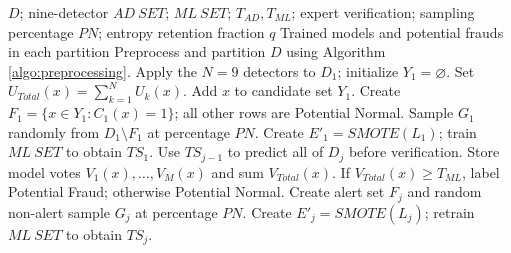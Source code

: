 \begin{algorithm}[htbp]
\footnotesize
\caption{Multilayered structure of the SAD algorithm}\label{algo:multilayer}
\begin{algorithmic}[1]
\REQUIRE $D$; nine-detector $AD\ SET$; $ML\ SET$; $T_{AD},T_{ML}$;
\STATE \hspace{1em} expert verification; sampling percentage $PN$; entropy retention fraction $q$
\ENSURE Trained models and potential frauds in each partition
\STATE Preprocess and partition $D$ using Algorithm \ref{algo:preprocessing}.
\STATE Apply the $N=9$ detectors to $D_1$; initialize $Y_1=\varnothing$.
\STATE Set $U_{Total}(x)=\sum_{k=1}^{N}U_k(x)$.
\STATE Add $x$ to candidate set $Y_1$.
\ENDIF
\ENDFOR
\STATE {}
\STATE {}
\STATE Create $F_1=\{x\in Y_1:C_1(x)=1\}$; all other rows are Potential Normal.
\STATE Sample $G_1$ randomly from $D_1\setminus F_1$ at percentage $PN$.
\STATE {}
\STATE Create $E'_1=SMOTE(L_1)$; train $ML\ SET$ to obtain $TS_1$.
\STATE Use $TS_{j-1}$ to predict all of $D_j$ before verification.
\STATE Store model votes $V_1(x),\ldots,V_M(x)$ and sum $V_{Total}(x)$.
\STATE If $V_{Total}(x)\geq T_{ML}$, label Potential Fraud; otherwise Potential Normal.
\ENDFOR
\STATE Create alert set $F_j$ and random non-alert sample $G_j$ at percentage $PN$.
\STATE {}
\STATE {}
\STATE Create $E'_j=SMOTE(L_j)$; retrain $ML\ SET$ to obtain $TS_j$.
\ENDIF
\ENDFOR
\end{algorithmic}
\end{algorithm}

